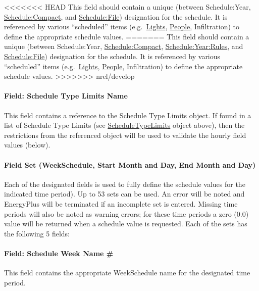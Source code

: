 <<<<<<< HEAD
This field should contain a unique (between Schedule:Year, \hyperref[schedulecompact]{Schedule:Compact}, and \hyperref[schedulefile]{Schedule:File}) designation for the schedule. It is referenced by various ``scheduled'' items (e.g.~\hyperref[lights-000]{Lights}, \hyperref[people]{People}, Infiltration) to define the appropriate schedule values.
=======
This field should contain a unique (between Schedule:Year, \hyperref[schedulecompact]{Schedule:Compact}, \hyperref[scheduleyearrules]{Schedule:Year:Rules}, and \hyperref[schedulefile]{Schedule:File}) designation for the schedule. It is referenced by various ``scheduled'' items (e.g.~\hyperref[lights-000]{Lights}, \hyperref[people]{People}, Infiltration) to define the appropriate schedule values.
>>>>>>> nrel/develop

\paragraph{Field: Schedule Type Limits Name}\label{field-schedule-type-limits-name-3}

This field contains a reference to the Schedule Type Limits object. If found in a list of Schedule Type Limits (see \hyperref[scheduletypelimits]{ScheduleTypeLimits} object above), then the restrictions from the referenced object will be used to validate the hourly field values (below).

\paragraph{Field Set (WeekSchedule, Start Month and Day, End Month and Day)}\label{field-set-weekschedule-start-month-and-day-end-month-and-day}

Each of the designated fields is used to fully define the schedule values for the indicated time period). Up to 53 sets can be used. An error will be noted and EnergyPlus will be terminated if an incomplete set is entered. Missing time periods will also be noted as warning errors; for these time periods a zero (0.0) value will be returned when a schedule value is requested. Each of the sets has the following 5 fields:

\paragraph{Field: Schedule Week Name \#}\label{field-schedule-week-name}

This field contains the appropriate WeekSchedule name for the designated time period.

